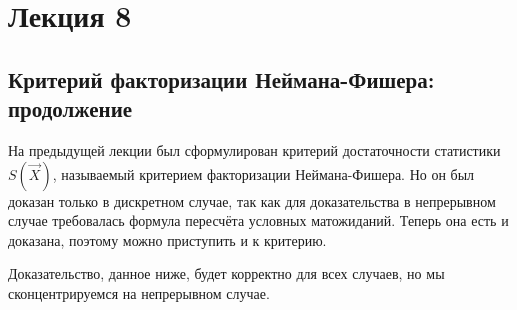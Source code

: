 \section{Лекция 8}
\subsection{Критерий факторизации Неймана-Фишера: продолжение}
На предыдущей лекции был сформулирован критерий достаточности статистики $S(\vec{X})$, называемый критерием факторизации Неймана-Фишера. Но он был доказан только в дискретном случае, так как для доказательства в непрерывном случае требовалась формула пересчёта условных матожиданий. Теперь она есть и доказана, поэтому можно приступить и к критерию.

Доказательство, данное ниже, будет корректно для всех случаев, но мы сконцентрируемся на непрерывном случае.
